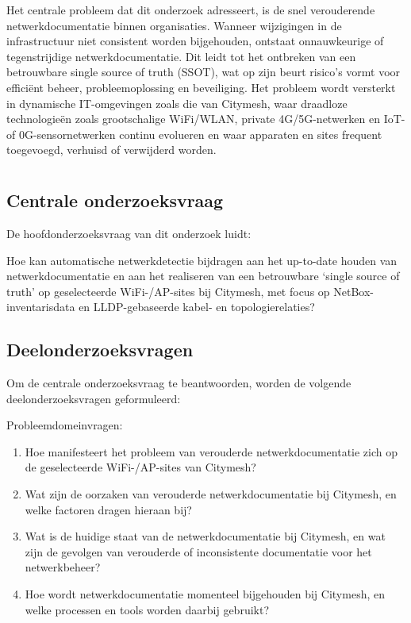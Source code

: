 Het centrale probleem dat dit onderzoek adresseert, is de snel verouderende netwerkdocumentatie binnen organisaties. Wanneer wijzigingen in de infrastructuur niet consistent worden bijgehouden, ontstaat onnauwkeurige of tegenstrijdige netwerkdocumentatie. Dit leidt tot het ontbreken van een betrouwbare single source of truth (SSOT), wat op zijn beurt risico's vormt voor efficiënt beheer, probleemoplossing en beveiliging\autocite{NetBoxOSS}. Het probleem wordt versterkt in dynamische IT-omgevingen zoals die van Citymesh, waar draadloze technologieën zoals grootschalige WiFi/WLAN, private 4G/5G-netwerken en IoT- of 0G-sensornetwerken continu evolueren en waar apparaten en sites frequent toegevoegd, verhuisd of verwijderd worden\autocite{CitymeshAbout,CitymeshNetworkService}.

\section{}%
\label{sec:onderzoeksvraag}

\subsection{Centrale onderzoeksvraag}

De hoofdonderzoeksvraag van dit onderzoek luidt:

Hoe kan automatische netwerkdetectie bijdragen aan het up-to-date houden van netwerkdocumentatie en aan het realiseren van een betrouwbare `single source of truth' op geselecteerde WiFi-/AP-sites bij Citymesh, met focus op NetBox-inventarisdata en LLDP-gebaseerde kabel- en topologierelaties?

\subsection{Deelonderzoeksvragen}

Om de centrale onderzoeksvraag te beantwoorden, worden de volgende deelonderzoeksvragen geformuleerd:

Probleemdomeinvragen:
\begin{enumerate}
  \item Hoe manifesteert het probleem van verouderde netwerkdocumentatie zich op de geselecteerde WiFi-/AP-sites van Citymesh?
  \item Wat zijn de oorzaken van verouderde netwerkdocumentatie bij Citymesh, en welke factoren dragen hieraan bij?
  \item Wat is de huidige staat van de netwerkdocumentatie bij Citymesh, en wat zijn de gevolgen van verouderde of inconsistente documentatie voor het netwerkbeheer?
  \item Hoe wordt netwerkdocumentatie momenteel bijgehouden bij Citymesh, en welke processen en tools worden daarbij gebruikt?
\end{enumerate}

